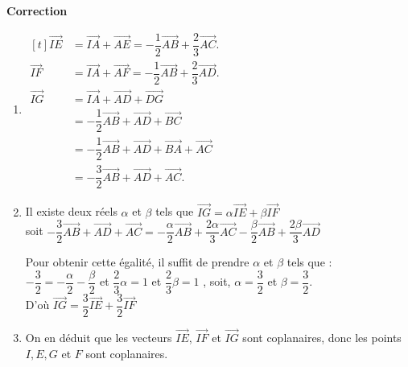 \documentclass{cornouaille}
\begin{document}
\begin{methode}
\textbf{Correction}



\begin{enumerate}
\item
  $ \begin{aligned}[t]
 \overrightarrow{IE} &= \overrightarrow{IA}+\overrightarrow{AE}=-\dfrac{1}{2}\overrightarrow{AB}+\dfrac{2}{3}\overrightarrow{AC}.\\
%
  \overrightarrow{IF}
  &=\overrightarrow{IA}+\overrightarrow{AF}=-\dfrac{1}{2}\overrightarrow{AB}+\dfrac{2}{3}\overrightarrow{AD}.\\
%
   \overrightarrow {IG}&=\overrightarrow{IA}+\overrightarrow{AD}+\overrightarrow{DG}\\
    &=-\dfrac{1}{2}\overrightarrow{AB}+\overrightarrow{AD}+\overrightarrow{BC}\\
    &=-\dfrac{1}{2}\overrightarrow{AB}+\overrightarrow{AD}+\overrightarrow{BA}+\overrightarrow{AC}\\
    &=-\dfrac{3}{2}\overrightarrow{AB}+\overrightarrow{AD}+\overrightarrow{AC}.
  \end{aligned}
  $

\item Il existe deux réels $\alpha$ et $\beta$ tels que
  $\overrightarrow{IG}=\alpha\overrightarrow{IE}+\beta\overrightarrow{IF}$
  \\[1mm]
  soit
  $
  -\dfrac{3}{2}\overrightarrow{AB}+\overrightarrow{AD}+\overrightarrow{AC}=-\dfrac{\alpha}{2}\overrightarrow{AB}+\dfrac{2\alpha}{3}\overrightarrow{AC}-\dfrac{\beta}{2}\overrightarrow{AB}+\dfrac{2\beta}{3}\overrightarrow{AD}$



Pour obtenir cette égalité, il suffit de prendre $\alpha$ et $\beta$
tels que : \\[1mm]
$-\dfrac{3}{2}=-\dfrac{\alpha}{2}-\dfrac{\beta}{2}$ et $\dfrac{2}{3} \alpha=1$ et $\dfrac{2}{3} \beta=1$ , soit, $ \alpha=\dfrac{3}{2}$ et $\beta=\dfrac{3}{2}$.\\[1mm]
D'où
$\overrightarrow{IG}=\dfrac{3}{2}\overrightarrow{IE}+\dfrac{3}{2}\overrightarrow{IF}$

\item On en déduit que les vecteurs $\overrightarrow{IE}$, $
  \overrightarrow{IF}$ et $\overrightarrow{IG}$ sont coplanaires, donc
  les points $I, E, G$ et $F$ sont coplanaires.
\end{enumerate}


\end{methode}
\end{document}
